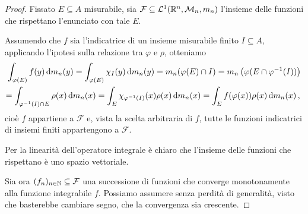 \begin{proof}
	Fissato $E\subseteq A$ misurabile, sia $\mathcal F\subseteq \mathcal L^1(\mathbb R^n,\mathcal M_n,m_n)$ l'insieme delle funzioni che rispettano l'enunciato con tale $E$.
	
	Assumendo che $f$ sia l'indicatrice di un insieme misurabile finito $I\subseteq A$, applicando l'ipotesi sulla relazione tra $\varphi$ e $\rho$, otteniamo
	\begin{multline*}
		\int_{\varphi(E)} f(y)\,\mathrm d m_n(y)=\int_{\varphi(E)} \chi_I(y)\,\mathrm d m_n(y)=m_n(\varphi(E)\cap I)=m_n\left(\varphi(E\cap \varphi^{-1}(I))\right) \\
		=\int_{\varphi^{-1}(I)\cap E}\rho(x)\,\mathrm d m_n(x)=\int_E \chi_{\varphi^{-1}(I)}(x)\rho(x)\,\mathrm d m_n(x)=\int_E f(\varphi(x))\rho(x)\,\mathrm d m_n(x) \, \text{, }
	\end{multline*}
	cioè $f$ appartiene a $\mathcal F$ e, vista la scelta arbitraria di $f$, tutte le funzioni indicatrici di insiemi finiti appartengono a $\mathcal F$.
	
	Per la linearità dell'operatore integrale è chiaro che l'insieme delle funzioni che rispettano è uno spazio vettoriale.
	
	Sia ora $(f_n)_{n\in\mathbb N}\subseteq \mathcal F$ una successione di funzioni che converge monotonamente alla funzione integrabile $f$. Possiamo assumere senza perdità di generalità, visto che basterebbe cambiare segno, che la convergenza sia crescente.
	

\end{proof}
